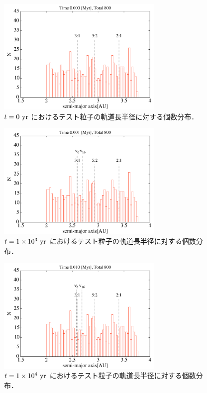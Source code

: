 \documentclass[11pt,a4paper,oneside,onecolumn]{jreport}
\begin{document}
\begin{figure}[H]
\centering
\includegraphics[width=8cm]{./image/asteroid_histogram_0yr.pdf}
\caption{$t = 0\ {\rm yr}$ におけるテスト粒子の軌道長半径に対する個数分布．\label{fig:asteroid_histogram_0yr}}
\end{figure}

\begin{figure}[H]
\centering
\includegraphics[width=8cm]{./image/asteroid_histogram_1kyr.pdf}
\caption{$t = 1 \times 10^3\ {\rm yr}$ におけるテスト粒子の軌道長半径に対する個数分布．\label{fig:asteroid_histogram_1kyr}}
\end{figure}

\begin{figure}[H]
\centering
\includegraphics[width=8cm]{./image/asteroid_histogram_10kyr.pdf}
\caption{$t = 1 \times 10^4\ {\rm yr}$ におけるテスト粒子の軌道長半径に対する個数分布．\label{fig:asteroid_histogram_10kyr}}
\end{figure}
\end{document}
